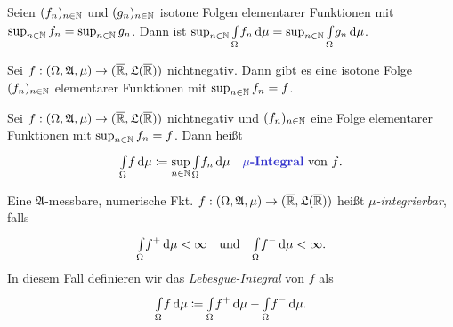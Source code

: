 \documentclass{cheat-sheet}
\newcommand{\Alg}{\mathfrak{A}} %
\newcommand{\LebAlg}{\mathfrak{L}} %
\newcommand{\ER}{\overline\R} %
\newcommand{\IntOmu}[1]{\Int{\Omega}{}{#1}{\mu}} %
\begin{document}
\begin{korollar}
  Seien $(f_n)_{n \in \mathbb{N}}$ und $(g_n)_{n \in \mathbb{N}}$ isotone Folgen elementarer Funktionen mit $\sup_{n \in \mathbb{N}} f_n = \sup_{n \in \mathbb{N}} g_n$. Dann ist $\sup_{n \in \N} \IntOmu{f_n} = \sup_{n \in \N} \IntOmu{g_n}$.
\end{korollar}

\begin{satz}
  Sei $f : (\Omega, \Alg, \mu) \to (\ER, \LebAlg(\ER))$ nichtnegativ. Dann gibt es eine isotone Folge $(f_n)_{n \in \mathbb{N}}$ elementarer Funktionen mit $\sup_{n \in \mathbb{N}} f_n = f$.
\end{satz}

\begin{defn}
  Sei $f : (\Omega, \Alg, \mu) \to (\ER, \LebAlg(\ER))$ nichtnegativ und $(f_n)_{n \in \mathbb{N}}$ eine Folge elementarer Funktionen mit $\sup_{n \in \mathbb{N}} f_n = f$. Dann heißt
  \[ \IntOmu{f} \coloneqq \sup_{n \in \N} \IntOmu{f_n} \quad \text{\emph{$\mu$-Integral} von $f$.} \]
\end{defn}


\begin{defn}
  Eine $\Alg$-messbare, numerische Fkt. $f : (\Omega, \Alg, \mu) \to (\ER, \LebAlg(\ER))$ heißt \emph{$\mu$-integrierbar}, falls
  \[ \IntOmu{f^+} < \infty \quad \text{und} \quad \IntOmu{f^-} < \infty. \]
  In diesem Fall definieren wir das \emph{Lebesgue-Integral} von $f$ als
  \[ \IntOmu{f} \coloneqq \IntOmu{f^+} - \IntOmu{f^-}. \]
\end{defn}

































\end{document}
